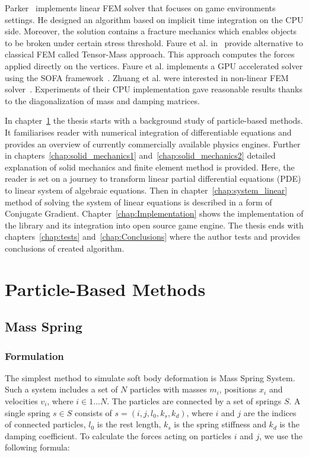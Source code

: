\documentclass[en]{minipw} %
\begin{document}
Parker~\cite{parker} implements linear FEM solver that focuses on game environments settings. He designed an algorithm based on implicit time integration on the CPU side. Moreover, the solution contains a fracture mechanics which enables objects to be broken under certain stress threshold.
Faure et al. in~\cite{tensor-mass} provide alternative to classical FEM called Tensor-Mass approach. This approach computes the forces applied directly on the vertices. Faure et al. implements a GPU accelerated solver using the SOFA framework~\cite{sofa}.
Zhuang et al. were interested in non-linear FEM solver~\cite{global_deformation}. Experiments of their CPU implementation gave reasonable results thanks to the diagonalization of mass and damping matrices.

In chapter~\ref{chap:background} the thesis starts with a background study of particle-based methods. It familiarises reader with numerical integration of differentiable equations and provides an overview of currently commercially available physics engines.
Further in chapters~\ref{chap:solid_mechanics1} and~\ref{chap:solid_mechanics2} detailed explanation of solid mechanics and finite element method is provided. Here, the reader is set on a journey to transform linear partial differential equations (PDE) to linear system of algebraic equations. Then in chapter~\ref{chap:system_linear} method of solving the system of linear equations is described in a form of  Conjugate Gradient.
Chapter~\ref{chap:Implementation} shows the implementation of the library and its integration into open source game engine.
The thesis ends with chapters~\ref{chap:tests} and~\ref{chap:Conclusions} where the author tests and provides conclusions of created algorithm.

\chapter{Particle-Based Methods}
\label{chap:background}

\section{Mass Spring}
\subsection{Formulation}
The simplest method to simulate soft body deformation is Mass Spring System.
Such a system includes a set of $N$ particles with masses $m_i$, positions $x_i$ and velocities $v_i$, where $i \in 1...N$. The particles are connected by a set of springs $S$. A single spring $s \in S$ consists of $s = (i, j, l_0, k_s, k_d)$, where $i$ and $j$ are the indices of connected particles, $l_0$ is the rest length, $k_s$ is the spring stiffness and $k_d$ is the damping coefficient. To calculate the forces acting on particles $i$ and $j$, we use the following formula:
\end{document}

